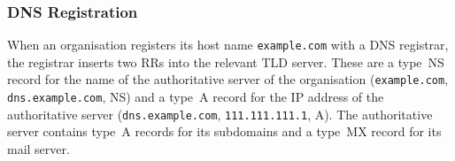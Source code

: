 \subsubsection{DNS Registration}

When an organisation registers its host name \texttt{example.com} with a DNS registrar, the registrar inserts two RRs into the relevant TLD server.
These are a type~NS record for the name of the authoritative server of the organisation (\texttt{example.com}, \texttt{dns.example.com}, NS) and a type~A record for the IP address of the authoritative server (\texttt{dns.example.com}, \texttt{111.111.111.1}, A).
The authoritative server contains type~A records for its subdomains and a type~MX record for its mail server.
